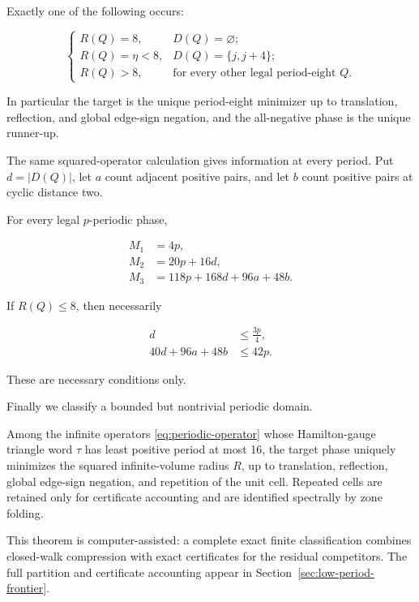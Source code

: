 \begin{theorem}
\label{thm:eight-barrier-trichotomy}
Exactly one of the following occurs:

\begin{equation}
\begin{cases}
R(Q)=8, & D(Q)=\varnothing; \\
R(Q)=\eta<8, & D(Q)=\{j,j+4\}; \\
R(Q)>8, & \text{for every other legal period-eight }Q.
\end{cases}
\end{equation}

In particular the target is the unique period-eight minimizer up to
translation, reflection, and global edge-sign negation, and the all-negative phase
is the unique runner-up.

\end{theorem}
The same squared-operator calculation gives information at every period. Put
\(d=\lvert D(Q)\rvert\), let \(a\) count adjacent positive pairs, and let \(b\) count positive
pairs at cyclic distance two.

\begin{theorem}
\label{thm:general-period-moment-obstruction}
For every legal
\(p\)-periodic phase,

\begin{equation}
\begin{aligned}
M_{1}&=4p, \\
M_{2}&=20p+16d, \\
M_{3}&=118p+168d+96a+48b.
\end{aligned}
\end{equation}

If \(R(Q)\leq 8\), then necessarily

\begin{equation}
\begin{aligned}
d&\leq \frac{3p}{4}, \\
40d+96a+48b&\leq 42p.
\end{aligned}
\end{equation}

These are necessary conditions only.

\end{theorem}
Finally we classify a bounded but nontrivial periodic domain.

\begin{theorem}
\label{thm:low-period-frontier}
Among the infinite operators \eqref{eq:periodic-operator} whose Hamilton-gauge
triangle word \(\tau\) has least positive period at most 16, the target phase
uniquely minimizes the squared infinite-volume radius \(R\), up to translation,
reflection, global edge-sign negation, and repetition
of the unit cell. Repeated cells are retained only for certificate accounting
and are identified spectrally by zone folding.

\end{theorem}
This theorem is computer-assisted: a complete exact finite classification combines closed-walk compression with exact certificates for the residual competitors. The full partition and certificate accounting appear in Section~\ref{sec:low-period-frontier}.

